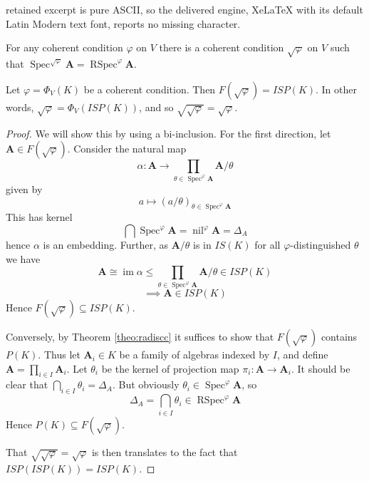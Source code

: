 \documentclass[10pt,a4paper]{amsart}
\newcommand{\RSpec}{\operatorname{RSpec}}
\newcommand{\Spec}{\operatorname{Spec}}
\newcommand{\nil}{\operatorname{nil}}
\begin{document}
retained excerpt is pure ASCII, so the delivered engine, XeLaTeX with its default Latin Modern text font, reports no missing character.
\begin{theorem} \label{theo:radiscc}
    For any coherent condition $\varphi$ on $V$ there is a coherent condition $\sqrt{\varphi}$ on $V$ such that $\Spec^{\sqrt{\varphi}}\mathbf{A} = \RSpec^\varphi\mathbf{A}$.
\end{theorem}

\begin{theorem} \label{theo:radfundclassisprevar}
    Let $\varphi = \Phi_V(K)$ be a coherent condition.
    Then $F(\sqrt{\varphi}) = ISP(K)$.
    In other words, $\sqrt{\varphi} = \Phi_V(ISP(K))$, and so $\sqrt{\sqrt{\varphi}} = \sqrt{\varphi}$.
\end{theorem}

\begin{proof}
    We will show this by using a bi-inclusion.
    For the first direction, let $\mathbf{A} \in F(\sqrt{\varphi})$.
    Consider the natural map 
    $$\alpha \colon \mathbf{A} \rightarrow \prod_{\theta \in \Spec^\varphi\mathbf{A}}\mathbf{A}/\theta$$
    given by 
    $$a \mapsto (a/\theta)_{\theta \in \Spec^\varphi\mathbf{A}}$$
    This has kernel
    $$\bigcap\Spec^\varphi\mathbf{A} = \nil^\varphi\mathbf{A} = \Delta_A$$
    hence $\alpha$ is an embedding.
    Further, as $\mathbf{A}/\theta$ is in $IS(K)$ for all $\varphi$-distinguished $\theta$ we have
    $$\mathbf{A} \cong \operatorname{im}\alpha \leq \prod_{\theta \in \Spec^\varphi\mathbf{A}}\mathbf{A}/\theta \in ISP(K)$$
    $$\implies \mathbf{A} \in ISP(K)$$
    Hence $F(\sqrt{\varphi}) \subseteq ISP(K)$.\par
    Conversely, by Theorem \ref{theo:radiscc} it suffices to show that $F(\sqrt{\varphi})$ contains $P(K)$.
    Thus let $\mathbf{A}_i \in K$ be a family of algebras indexed by $I$, and define $\mathbf{A} = \prod_{i \in I}\mathbf{A}_i$.
    Let $\theta_i$ be the kernel of projection map $\pi_i \colon \mathbf{A} \rightarrow \mathbf{A}_i$.
    It should be clear that $\bigcap_{i \in I} \theta_i = \Delta_A$.
    But obviously $\theta_i \in \Spec^\varphi\mathbf{A}$, so
    $$\Delta_A = \bigcap_{i \in I} \theta_i \in \RSpec^\varphi\mathbf{A}$$
    Hence $P(K) \subseteq F(\sqrt{\varphi})$.\par
    That $\sqrt{\sqrt{\varphi}} = \sqrt{\varphi}$ is then translates to the fact that $ISP(ISP(K)) = ISP(K)$.
\end{proof}
\end{document}
